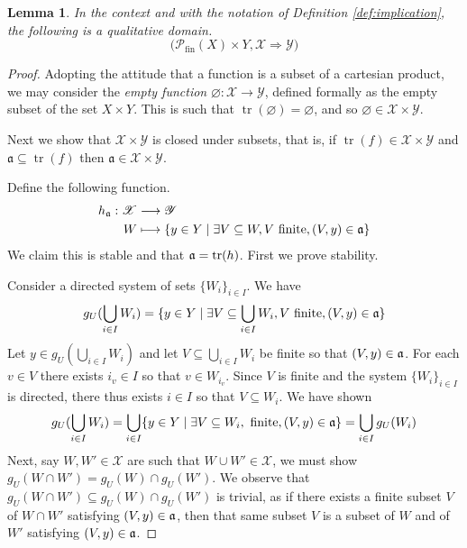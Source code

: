 \documentclass[12pt]{article}
\theoremstyle{plain}
\newtheorem{lemma}[thm]{Lemma}
\theoremstyle{definition}
\newcommand{\scr}[1]{\mathscr{#1}}
\newcommand{\call}[1]{\mathcal{#1}}
\newcommand{\lto}{\longrightarrow}
\begin{document}
	\begin{lemma}\label{lem:implication_qd}
		In the context and with the notation of Definition \ref{def:implication}, the following is a qualitative domain.
		\begin{equation}
			\big(\call{P}_{\text{fin}}(X) \times Y, \scr{X} \Rightarrow \scr{Y}\big)
			\end{equation}
		\end{lemma}
	\begin{proof}
		Adopting the attitude that a function is a subset of a cartesian product, we may consider the \emph{empty function} $\varnothing: \scr{X} \lto \scr{Y}$, defined formally as the empty subset of the set $X \times Y$. This is such that $\operatorname{tr}(\varnothing) = \varnothing$, and so $\varnothing \in \scr{X} \times \scr{Y}$.
		
		Next we show that $\scr{X} \times \scr{Y}$ is closed under subsets, that is, if $\operatorname{tr}(f) \in \scr{X} \times \scr{Y}$ and $\mathfrak{a} \subseteq \operatorname{tr}(f)$ then $\mathfrak{a} \in \scr{X} \times \scr{Y}$.
		
		Define the following function.
		\begin{align}
			\label{eq:subset}h_{\frak{a}}: \scr{X} &\lto \scr{Y}\\
			W &\longmapsto \{ y \in Y \mid \exists V \subseteq W, V \text{ finite}, (V, y) \in \frak{a} \}
			\end{align}
		We claim this is stable and that $\frak{a} =\operatorname{tr}(h)$. First we prove stability.
		
		Consider a directed system of sets $\{ W_i \}_{i \in I}$. We have
		\begin{equation}
			g_U(\bigcup_{i \in I}W_i) = \{ y \in Y \mid \exists V \subseteq \bigcup_{i \in I}W_i, V\text{ finite}, (V,y) \in \frak{a} \}
			\end{equation}
		Let $y \in g_U(\bigcup_{i \in I}W_i)$ and let $V \subseteq \bigcup_{i \in I}W_i$ be finite so that $(V,y) \in \frak{a}$. For each $v \in V$ there exists $i_v \in I$ so that $v \in W_{i_v}$. Since $V$ is finite and the system $\{ W_i \}_{i \in I}$ is directed, there thus exists $i \in I$ so that $V \subseteq W_i$. We have shown
		\begin{equation}
			g_U(\bigcup_{i \in I}W_i) = \bigcup_{i \in I}\{ y \in Y \mid \exists V \subseteq W_i,\text{ finite}, (V,y) \in \frak{a} \} = \bigcup_{i \in I}g_U(W_i)
			\end{equation}
		Next, say $W, W' \in \scr{X}$ are such that $W \cup W' \in \scr{X}$, we must show $g_U(W \cap W') = g_U(W) \cap g_U(W')$. We observe that $g_U(W \cap W') \subseteq g_U(W) \cap g_U(W')$ is trivial, as if there exists a finite subset $V$ of $W \cap W'$ satisfying $(V,y) \in \frak{a}$, then that same subset $V$ is a subset of $W$ and of $W'$ satisfying $(V,y) \in \frak{a}$.
		

\end{proof}
\end{document}
